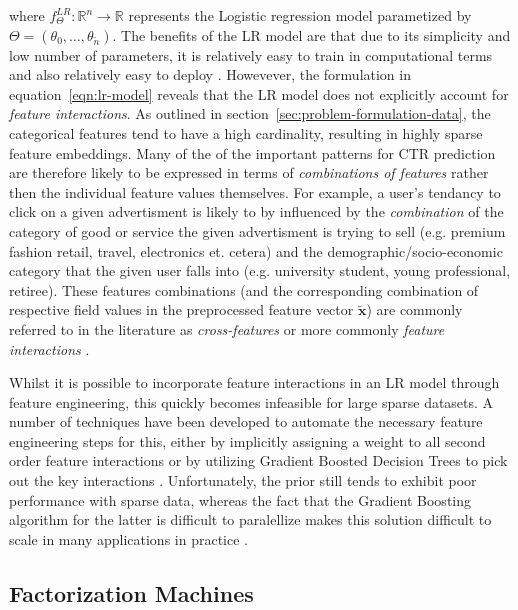 \documentclass{mldsmsc}
\begin{document}
where $f_{\Theta}^{LR}: \mathbb{R}^n \rightarrow \mathbb{R}$ represents the Logistic regression
model parametized by $\Theta = (\theta_0, \ldots, \theta_{\tilde{n}})$. The benefits of the LR
model are that due to its simplicity and low number of parameters, it is relatively easy to
train in computational terms and also relatively easy to deploy \citep{RefWorks:zhang2021deep}.
Howevever, the formulation in equation~\ref{eqn:lr-model} reveals that the LR model does not explicitly 
account for \emph{feature interactions}.
As outlined in section~\ref{sec:problem-formulation-data}, the categorical features tend to have a
high cardinality, resulting in highly sparse feature embeddings. Many of the of the important patterns
for CTR prediction are therefore likely to be expressed in terms of \emph{combinations of features}
rather then the individual feature values themselves. For example, a user's tendancy to
click on a given advertisment is likely to by influenced by the \emph{combination} of the category
of good or service the given advertisment is trying to sell (e.g. premium fashion retail, travel, electronics et. cetera)
and the demographic/socio-economic category that the given user falls into (e.g. university student, young professional, retiree).
These features combinations (and the corresponding combination of respective field values 
in the preprocessed feature vector $\tilde{\mathbf{x}}$) are commonly referred to in
the literature as \emph{cross-features} \citep{RefWorks:zhang2023memonet:} or more commonly
\emph{feature interactions} \citep{RefWorks:cheng2016wide,RefWorks:xiao2017attentional,RefWorks:song2019autoint}.

Whilst it is possible to incorporate feature interactions in an LR model through feature
engineering, this quickly becomes infeasible for large sparse datasets. A number of techniques
have been developed to automate the necessary feature engineering steps for this, either by
implicitly assigning a weight to all second order feature interactions \citep{RefWorks:chang2010training}
or by utilizing Gradient Boosted Decision Trees to pick out the key interactions \citep{RefWorks:cheng2014gradient}.
Unfortunately, the prior still tends to exhibit poor performance with sparse data, 
whereas the fact that the Gradient Boosting algorithm for the latter is difficult to paralellize
makes this solution difficult to scale in many applications in practice \citep{RefWorks:zhang2021deep}.

\subsection{Factorization Machines}
\end{document}
